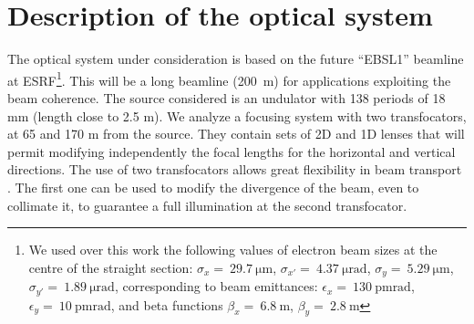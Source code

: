 \documentclass[preprint]{iucr}
\newcommand{\inred}[1]{{\color{red}#1}}
\begin{document}
\section{Description of the optical system}
\label{sec:beamline}

The optical system under consideration is based on the future ``EBSL1'' beamline at ESRF\footnote{We used over this work the following values of electron beam sizes at the \inred{centre} of the straight section: $\sigma_x=~\SI{29.7}{\micro\meter}$,
$\sigma_{x'}=~\SI{4.37}{\micro\radian}$,
$\sigma_y=~\SI{5.29}{\micro\meter}$,
$\sigma_{y'}=~\SI{1.89}{\micro\radian}$, corresponding to beam emittances:  $\epsilon_x=~\SI{130}{\pico\meter \radian}$,
$\epsilon_y=~\SI{10}{\pico\meter \radian}$, and beta functions
$\beta_x=~\SI{6.8}{\meter}$,
$\beta_y=~\SI{2.8}{\meter}$
}. This will be a long beamline (\SI{200}{\meter}) for applications exploiting the beam coherence. The source considered is an undulator with 138 periods \inred{of} 18 mm (length close to 2.5 m).  
We analyze a focusing system with two transfocators, at 65 and 170 m from the source. They contain sets of 2D and 1D lenses that will permit modifying independently the focal lengths for the horizontal and vertical directions. The use of two transfocators allows great flexibility in beam transport \cite{Vaughan:kv5084}. The first one can be used to modify the divergence of the beam, even to collimate it, to guarantee a full illumination at the second transfocator.  
\end{document}
